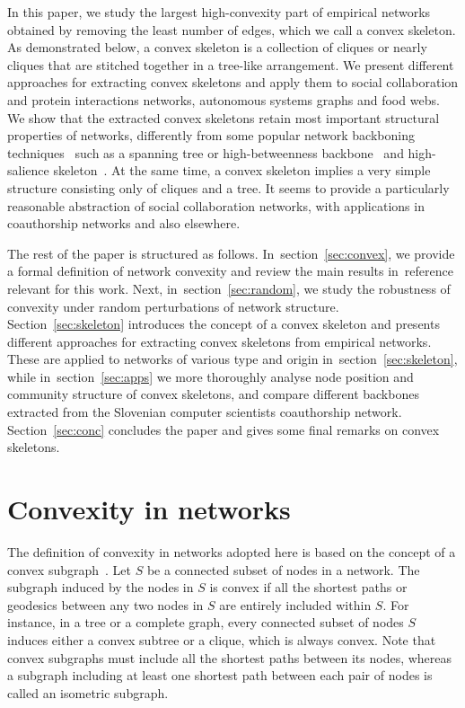 \documentclass[]{rsif}
\newcommand{\cref}[1]{reference~\cite{#1}\xspace}
\newcommand{\secref}[1]{section~\ref{sec:#1}\xspace}
\newcommand{\Secref}[1]{Section~\ref{sec:#1}\xspace}
\begin{document}
In this paper, we study the largest high-convexity part of empirical networks obtained by removing the least number of edges, which we call a convex skeleton. As demonstrated below, a convex skeleton is a collection of cliques or nearly cliques that are stitched together in a tree-like arrangement. We present different approaches for extracting convex skeletons and apply them to social collaboration and protein interactions networks, autonomous systems graphs and food webs. We show that the extracted convex skeletons retain most important structural properties of networks, differently from some popular network backboning techniques~\cite{HLMSW16,CN17} such as a spanning tree or high-betweenness backbone~\cite{Fre77} and high-salience skeleton~\cite{GTB12}. At the same time, a convex skeleton implies a very simple structure consisting only of cliques and a tree. It seems to provide a particularly reasonable abstraction of social collaboration networks, with applications in coauthorship networks and also elsewhere.

The rest of the paper is structured as follows. In~\secref{convex}, we provide a formal definition of network convexity and review the main results in~\cref{MS18} relevant for this work. Next, in~\secref{random}, we study the robustness of convexity under random perturbations of network structure. \Secref{skeleton} introduces the concept of a convex skeleton and presents different approaches for extracting convex skeletons from empirical networks. These are applied to networks of various type and origin in~\secref{skeleton}, while in~\secref{apps} we more thoroughly analyse node position and community structure of convex skeletons, and compare different backbones extracted from the Slovenian computer scientists coauthorship network. \Secref{conc} concludes the paper and gives some final remarks on convex skeletons.

%
%

\section{\label{sec:convex}Convexity in networks}

The definition of convexity in networks adopted here is based on the concept of a convex subgraph~\cite{HN81,FJ86,Van93,Pel13}. Let $S$ be a connected subset of nodes in a network. The subgraph induced by the nodes in $S$ is convex if all the shortest paths or geodesics between any two nodes in $S$ are entirely included within $S$. For instance, in a tree or a complete graph, every connected subset of nodes $S$ induces either a convex subtree or a clique, which is always convex. Note that convex subgraphs must include all the shortest paths between its nodes, whereas a subgraph including at least one shortest path between each pair of nodes is called an isometric subgraph. 
\end{document}
